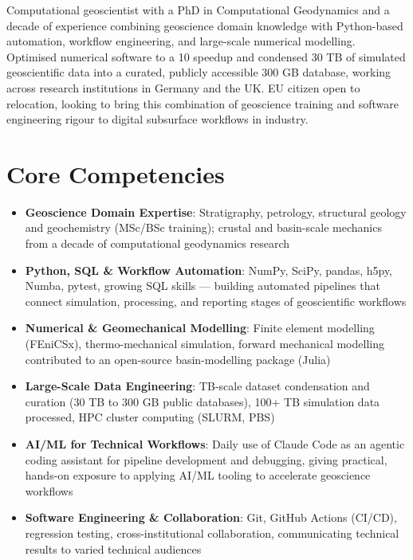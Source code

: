 \documentclass[11pt,a4paper,sans]{moderncv}
\begin{document}
\makecvtitle


\vspace{6pt}
\small{Computational geoscientist with a PhD in Computational Geodynamics and a decade of experience combining geoscience domain knowledge with Python-based automation, workflow engineering, and large-scale numerical modelling. Optimised numerical software to a 10\texttimes{} speedup and condensed 30 TB of simulated geoscientific data into a curated, publicly accessible 300 GB database, working across research institutions in Germany and the UK. EU citizen open to relocation, looking to bring this combination of geoscience training and software engineering rigour to digital subsurface workflows in industry.}


\section{Core Competencies}
\vspace{1pt}
\begin{itemize}

\item \textbf{Geoscience Domain Expertise}: Stratigraphy, petrology, structural geology and geochemistry (MSc/BSc training); crustal and basin-scale mechanics from a decade of computational geodynamics research

\item \textbf{Python, SQL \& Workflow Automation}: NumPy, SciPy, pandas, h5py, Numba, pytest, growing SQL skills — building automated pipelines that connect simulation, processing, and reporting stages of geoscientific workflows

\item \textbf{Numerical \& Geomechanical Modelling}: Finite element modelling (FEniCSx), thermo-mechanical simulation, forward mechanical modelling contributed to an open-source basin-modelling package (Julia)

\item \textbf{Large-Scale Data Engineering}: TB-scale dataset condensation and curation (30 TB to 300 GB public databases), 100+ TB simulation data processed, HPC cluster computing (SLURM, PBS)

\item \textbf{AI/ML for Technical Workflows}: Daily use of Claude Code as an agentic coding assistant for pipeline development and debugging, giving practical, hands-on exposure to applying AI/ML tooling to accelerate geoscience workflows

\item \textbf{Software Engineering \& Collaboration}: Git, GitHub Actions (CI/CD), regression testing, cross-institutional collaboration, communicating technical results to varied technical audiences

\end{itemize}
\end{document}
